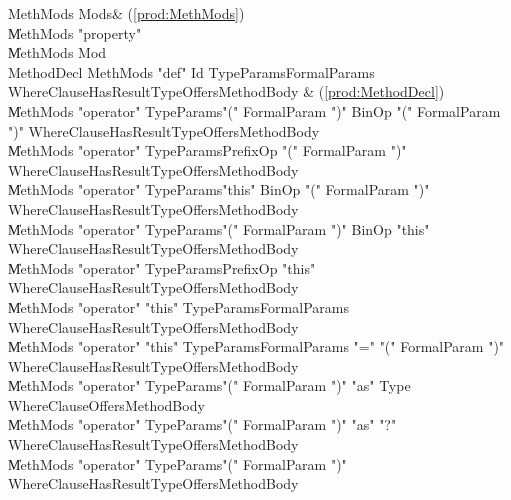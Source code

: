 \begin{bbgrammar}
            MethMods \: Mods\opt & (\ref{prod:MethMods}) \\
                    \| MethMods \xcd"property"  \\
                    \| MethMods Mod \\
          MethodDecl \: MethMods \xcd"def" Id TypeParams\opt FormalParams WhereClause\opt HasResultType\opt Offers\opt MethodBody & (\ref{prod:MethodDecl}) \\
                    \| MethMods \xcd"operator" TypeParams\opt \xcd"(" FormalParam  \xcd")" BinOp \xcd"(" FormalParam  \xcd")" WhereClause\opt HasResultType\opt Offers\opt MethodBody \\
                    \| MethMods \xcd"operator" TypeParams\opt PrefixOp \xcd"(" FormalParam  \xcd")" WhereClause\opt HasResultType\opt Offers\opt MethodBody \\
                    \| MethMods \xcd"operator" TypeParams\opt \xcd"this" BinOp \xcd"(" FormalParam  \xcd")" WhereClause\opt HasResultType\opt Offers\opt MethodBody \\
                    \| MethMods \xcd"operator" TypeParams\opt \xcd"(" FormalParam  \xcd")" BinOp \xcd"this" WhereClause\opt HasResultType\opt Offers\opt MethodBody \\
                    \| MethMods \xcd"operator" TypeParams\opt PrefixOp \xcd"this" WhereClause\opt HasResultType\opt Offers\opt MethodBody \\
                    \| MethMods \xcd"operator" \xcd"this" TypeParams\opt FormalParams WhereClause\opt HasResultType\opt Offers\opt MethodBody \\
                    \| MethMods \xcd"operator" \xcd"this" TypeParams\opt FormalParams \xcd"=" \xcd"(" FormalParam  \xcd")" WhereClause\opt HasResultType\opt Offers\opt MethodBody \\
                    \| MethMods \xcd"operator" TypeParams\opt \xcd"(" FormalParam  \xcd")" \xcd"as" Type WhereClause\opt Offers\opt MethodBody \\
                    \| MethMods \xcd"operator" TypeParams\opt \xcd"(" FormalParam  \xcd")" \xcd"as" \xcd"?" WhereClause\opt HasResultType\opt Offers\opt MethodBody \\
                    \| MethMods \xcd"operator" TypeParams\opt \xcd"(" FormalParam  \xcd")" WhereClause\opt HasResultType\opt Offers\opt MethodBody \\

\end{bbgrammar}
